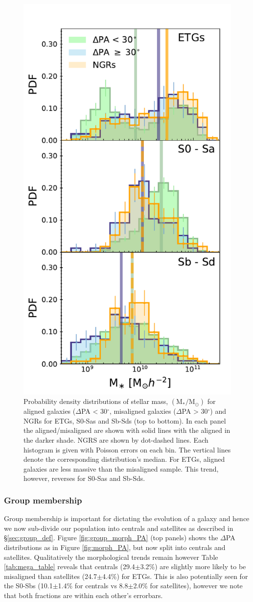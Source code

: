 \begin{figure}
    \centering
	\includegraphics[width=0.5\linewidth]{thesis/latex/misalignment_MaNGA/delPA_stelM_morph_nsa.pdf}
    \caption{Probability density distributions of stellar mass, $\mathrm{(M_{\ast}/M_{\odot})}$ for aligned galaxies ($\Delta$PA < 30$^{\circ}$, misaligned galaxies ($\Delta$PA > 30$^{\circ}$) and NGRs for ETGs, S0-Sas and Sb-Sds (top to bottom). In each panel the aligned/misaligned are shown with solid lines with the aligned in the darker shade. NGRS are shown by dot-dashed lines. Each histogram is given with Poisson errors on each bin. The vertical lines denote the corresponding distribution's median. For ETGs, aligned galaxies are less massive than the misaligned sample. This trend, however, reverses for S0-Sas and Sb-Sds.}
    \label{fig:morph_stelM}
\end{figure}

\subsubsection{Group membership}
Group membership is important for dictating the evolution of a galaxy and hence we now sub-divide our population into centrals and satellites as described in \S\ref{sec:group_def}. Figure \ref{fig:group_morph_PA} (top panels) shows the $\Delta$PA distributions as in Figure \ref{fig:morph_PA}, but now split into centrals and satellites. Qualitatively the morphological trends remain however Table \ref{tab:mega_table} reveals that centrals (29.4$\pm$3.2\%) are slightly more likely to be misaligned than satellites (24.7$\pm$4.4\%) for ETGs. This is also potentially seen for the S0-Sbs (10.1$\pm$1.4\% for centrals vs 8.8$\pm$2.0\% for satellites), however we note that both fractions are within each other's errorbars.

